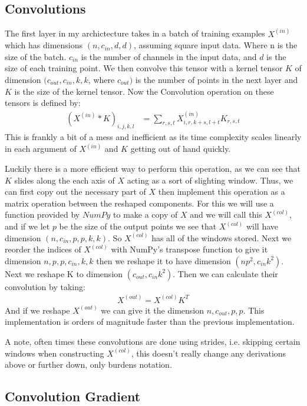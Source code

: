 \documentclass[12pt]{article}
\begin{document}
\subsection*{Convolutions}
The first layer in my archictecture takes in a batch of training examples
$X^{(in)}$ which has dimensions $(n, c_{in}, d, d)$, assuming square input data. Where n is the size of the batch. 
$c_{in}$ is the number of channels in the input data, and $d$ is the size of each training point. We then
convolve this tensor with a kernel tensor $K$ of dimension $(c_{out}, c_{in}, k, k$, where $c_{out})$ is the number
of points in the next layer and $K$ is the size of the kernel tensor. Now the Convolution operation on these tensors
is defined by:
\begin{align*}
    (X^{(in)} * K)_{i,j,k,l} &= \sum_{r,s,t}X^{(in)}_{i,r,k + s, l + t}K_{r,s,t}
\end{align*}
This is frankly a bit of a mess and inefficient as its time complexity scales linearly in each
argument of $X^{(in)}$ and $K$ getting out of hand quickly.


Luckily there is a more efficient way to perform this operation, as we can see that $K$ slides
along the each axis of $X$ acting as a sort of slighting window. Thus, we can
first copy out the necessary part of $X$ then implement this operation as a matrix operation
between the reshaped components. For this we will use a function provided
by $NumPy$ to make a copy of $X$ and we will call this $X^{(col)}$, and if we let
$p$ be the size of the output points we see that $X^{(col)}$ will have dimension
$(n, c_{in}, p, p, k, k)$. So $X^{(col)}$ has all of the windows stored. Next we
reorder the indices of $X^{(col)}$ with NumPy's transpose function to give it
dimension $n, p, p, c_{in}, k, k$ then we reshape it to have dimension $(np^2, c_{in}k^2)$.
Next we reshape K to dimension $(c_{out}, c_{in}k^2)$. Then we can calculate
their convolution by taking:
\begin{align*}
    X^{(out)} = X^{(col)}K^T
\end{align*}
And if we reshape $X^{(out)}$ we can give it the dimension $n, c_{out}, p, p$.
This implementation is orders of magnitude faster than the previous implementation.


A note, often times these convolutions are done using strides, i.e. skipping certain windows when constructing
$X^{(col)}$, this doesn't really change any derivations above or further down, only burdens notation.

\subsection*{Convolution Gradient}
\end{document}
